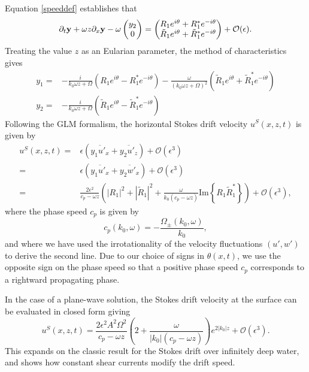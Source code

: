 \documentclass[a4paper,11pt]{article}
\newcommand{\bp}{\begin{pmatrix}}
\newcommand{\ep}{\end{pmatrix}}
\newcommand{\p}{\partial}
\begin{document}
Equation \eqref{speeddef} establishes that
\[
\p_{t}{\bf y} + \omega z \p_{x}{\bf y} - \omega \bp y_{2}\\ 0 \ep = \bp R_{1}e^{i\theta}+R^{\ast}_{1}e^{-i\theta}\\ \tilde{R}_{1}e^{i\theta}+\tilde{R}^{\ast}_{1}e^{-i\theta} \ep + \mathcal{O}(\epsilon).
\]
Treating the value $z$ as an Eularian parameter, the method of characteristics gives 
\begin{align*}
y_{1} = & - \frac{i}{k_{0}\omega z + \Omega}\left(R_{1}e^{i\theta} -R^{\ast}_{1}e^{-i\theta} \right) - \frac{\omega}{(k_{0}\omega z + \Omega)^{2}}\left(\tilde{R}_{1}e^{i\theta} + \tilde{R}^{\ast}_{1}e^{-i\theta} \right)\\
y_{2} = & - \frac{i}{k_{0}\omega z + \Omega}\left(\tilde{R}_{1}e^{i\theta} -\tilde{R}^{\ast}_{1}e^{-i\theta} \right)
\end{align*}
Following the GLM formalism, the horizontal Stokes drift velocity $u^{S}(x,z,t)$ is given by 
\begin{align*}
u^{S}(x,z,t) = & \epsilon \left(\overline{y_{1}u'_{x}} + \overline{y_{2}u'_{z}}\right)  + \mathcal{O}(\epsilon^{3})\\
= & \epsilon \left(\overline{y_{1}u'_{x}} + \overline{y_{2}w'_{x}}\right)  + \mathcal{O}(\epsilon^{3})\\
= & \frac{2\epsilon^{2}}{c_{p}-\omega z}\left(\left|R_{1}\right|^{2} + \left|\tilde{R}_{1}\right|^{2} + \frac{\omega}{k_{0}(c_{p}-\omega z)}\mbox{Im}\left\{R_{1}\tilde{R}_{1}^{\ast}\right\} \right) + \mathcal{O}(\epsilon^{3}),
\end{align*}
where the phase speed $c_{p}$ is given by 
\[
c_{p}(k_{0},\omega) = -\frac{\Omega_{\pm}(k_{0},\omega)}{k_{0}},
\]
and where we have used the irrotationality of the velocity fluctuations $(u',w')$ to derive the second line.  Due to our choice of signs in $\theta(x,t)$, we use the opposite sign on the phase speed so that a positive phase speed $c_{p}$ corresponds to a rightward propagating phase.  

In the case of a plane-wave solution, the Stokes drift velocity at the surface can be evaluated in closed form giving  
\begin{equation}
u^{S}(x,z,t) = \frac{2\epsilon^{2}A^{2}\Omega^{2}}{c_{p}-\omega z} \left(2  + \frac{\omega}{|k_{0}|(c_{p}-\omega z)} \right) e^{2|k_{0}|z} + \mathcal{O}(\epsilon^{3}).
\label{pwavesdrift}
\end{equation}
This expands on the classic result for the Stokes drift over infinitely deep water, and shows how constant shear currents modify the drift speed.
\end{document}

